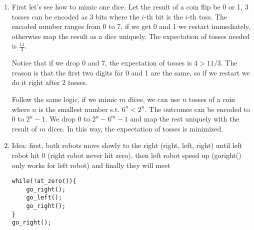 \documentclass[10pt, onecolumn, draftcls]{IEEEtran}
\begin{document}
\begin{enumerate}
\item

First let's see how to mimic one dice. Let the result of a coin flip be 0 or 1, 3 tosses can be encoded as 3 bits where the $i$-th bit is the $i$-th toss. The encoded number ranges from 0 to 7, if we get 0 and 1 we restart immediately, otherwise map the result as a dice uniquely. The expectation of tosses needed is $\frac{11}{3}.$ 

Notice that if we drop 0 and 7, the expectation of tosses is $4>11/3$. The reason is that the first two digits for 0 and 1 are the same, so if we restart we do it right after 2 tosses.

Follow the same logic, if we mimic $m$ dices, we can use $n$ tosses of a coin where $n$ is the smallest number s.t. $6^n<2^n$. The outcomes can be encoded to 0 to $2^n-1$. We drop $0$ to $2^n-6^m-1$ and map the rest uniquely with the result of $m$ dices. In this way, the expectation of tosses is minimized.

\item Idea: first, both robots move slowly to the right (right, left, right) until left robot hit 0 (right robot never hit zero), then left robot speed up (goright() only works for left robot) and finally they will meet

\begin{lstlisting}
while(!at_zero()){
    go_right();
    go_left();
    go_right();
} 
go_right();

\end{lstlisting}
\end{enumerate}
\end{document}
